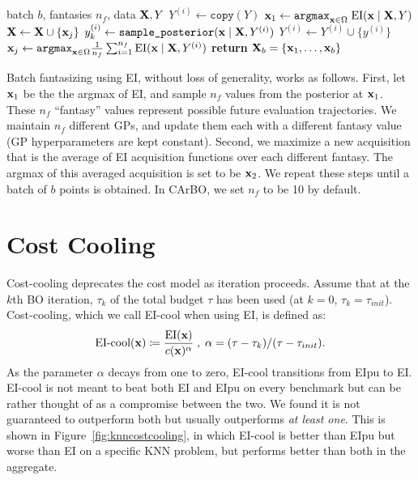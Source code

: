 \documentclass{article}
\newcommand{\EI}{{\text{EI}}}
\begin{document}
\begin{algorithm}[h]
\caption{Batch Fantasizing with EI}
\label{algorithm_batch}
\begin{algorithmic}[1]
   batch $b$, fantasies $n_f$, data ${\mathbf X},Y$
        \STATE $Y^{(i)} \gets \texttt{copy}(Y)$ 
    \ENDFOR
    \STATE ${\mathbf x}_1 \gets \texttt{argmax}_{{\mathbf x} \in \Omega} \; \text{EI}({\mathbf x} \;|\;  {\mathbf X}, Y ) $ 
        \STATE ${\mathbf X} \gets {\mathbf X} \cup \{{\mathbf x}_j \}$
            \STATE $y_k^{(i)} \gets \texttt{sample\_posterior}({\mathbf x} \;|\;  {\mathbf X}, Y^{(i)})$ 
            \STATE $ Y^{(i)} \gets Y^{(i)} \cup \{ y^{(i)}\}$
        \ENDFOR
        \STATE ${\mathbf x}_j \gets \texttt{argmax}_{{\mathbf x} \in \Omega} \frac{1}{n_f} \sum_{i=1}^{n_f} \text{EI}({\mathbf x} \;|\;  {\mathbf X}, Y^{(i)})$
    \ENDFOR
    \STATE \textbf{return} ${\mathbf X}_b = \{ {\mathbf x}_1, \dots, {\mathbf x}_b\}$
\end{algorithmic}  
\end{algorithm}

Batch fantasizing using EI, without loss of generality, works as follows. First, let ${\mathbf x}_1$ be the the argmax of EI, and sample $n_f$ values from the posterior at ${\mathbf x}_1$. These $n_f$ ``fantasy'' values represent possible future evaluation trajectories. We maintain $n_f$ different GPs, and update them each with a different fantasy value (GP hyperparameters are kept constant). Second, we maximize a new acquisition that is the average of EI acquisition functions over each different fantasy. The argmax of this averaged acquisition is set to be ${\mathbf x}_2$. We repeat these steps until a batch of $b$ points is obtained. In CArBO, we set $n_f$ to be 10 by default. 

\section{Cost Cooling}
Cost-cooling deprecates the cost model as iteration proceeds. Assume that at the $k$th BO iteration, $\tau_k$ of the total budget $\tau$ has been used (at $k=0$, $\tau_k = \tau_{init}$). Cost-cooling, which we call EI-cool when using EI, is defined as:
\begin{equation}\label{ei-cool}
\text{EI-cool}(\xb) \coloneqq \frac{\EI(\xb)}{c(\xb)^\alpha} \;,\; \alpha = (\tau - \tau_k) / (\tau - \tau_{init}).
\end{equation}
As the parameter $\alpha$ decays from one to zero, EI-cool transitions from EIpu to EI. EI-cool is not meant to beat both EI and EIpu on every benchmark but can be rather thought of as a compromise between the two. We found it is not guaranteed to outperform both but usually outperforms \textit{at least one}. This is shown in Figure~\ref{fig:knncostcooling}, in which EI-cool is better than EIpu but worse than EI on a specific KNN problem, but performs better than both in the aggregate. 
\end{document}
